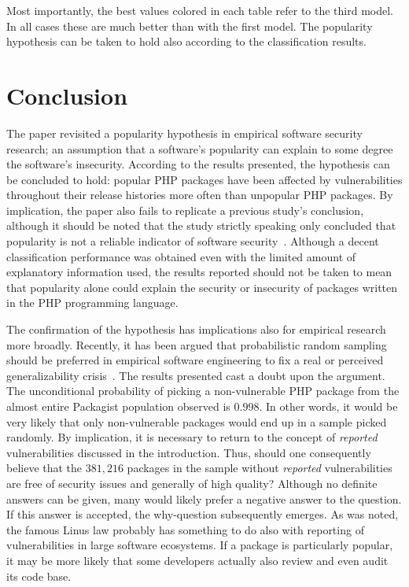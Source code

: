 \documentclass[5p, twocolumn, numbers, sort]{elsarticle}
\begin{document}
Most importantly, the best values colored in each table refer to the third
model. In all cases these are much better than with the first model. The
popularity hypothesis can be taken to hold also according to the classification
results.

\section{Conclusion}\label{sec: conclusion}

The paper revisited a popularity hypothesis in empirical software security
research; an assumption that a software's popularity can explain to some degree
the software's insecurity. According to the results presented, the hypothesis can
be concluded to hold: popular PHP packages have been affected by vulnerabilities
throughout their release histories more often than unpopular PHP packages. By
implication, the paper also fails to replicate a previous study's conclusion,
although it should be noted that the study strictly speaking only concluded that
popularity is not a reliable indicator of software
security~\cite{Siavvas18}. Although a decent classification performance was
obtained even with the limited amount of explanatory information used, the
results reported should not be taken to mean that popularity alone could explain
the security or insecurity of packages written in the PHP programming language.

The confirmation of the hypothesis has implications also for empirical research
more broadly. Recently, it has been argued that probabilistic random sampling
should be preferred in empirical software engineering to fix a real or perceived
generalizability crisis~\cite{Baltes22}. The results presented cast a doubt upon
the argument. The unconditional probability of picking a non-vulnerable PHP
package from the almost entire Packagist population observed is $0.998$. In
other words, it would be very likely that only non-vulnerable packages would end
up in a sample picked randomly. By implication, it is necessary to return to the
concept of \textit{reported} vulnerabilities discussed in the
introduction. Thus, should one consequently believe that the $381,216$ packages
in the sample without \textit{reported} vulnerabilities are free of security
issues and generally of high quality? Although no definite answers can be given,
many would likely prefer a negative answer to the question. If this answer is
accepted, the why-question subsequently emerges. As was noted, the famous Linus
law probably has something to do also with reporting of vulnerabilities in large
software ecosystems. If a package is particularly popular, it may be more likely
that some developers actually also review and even audit its code base.
\end{document}
